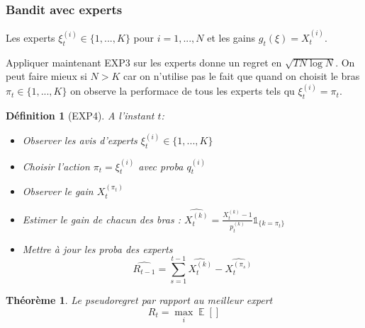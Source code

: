 \documentclass{article}
\DeclareMathOperator*{\E}{\mathbb{E}}
\newtheorem{definition}{Définition}[section]
\newtheorem{theorem}{Théorème}[section]
\theoremstyle{remark}
\theoremstyle{remark}
\begin{document}
\subsubsection{Bandit avec experts}

Les experts $\xi_t^{(i)} \in \{1, ..., K\}$ pour $i=1,...,N$ et les gains $g_t(\xi) = X_t^{(i)}$.

Appliquer maintenant EXP3 sur les experts donne un regret en $\sqrt{T N \log N}$. On peut faire mieux si $N>K$ car on n'utilise pas le fait que quand on choisit le bras $\pi_t \in \{1,...,K\}$ on observe la performace de tous les experts tels qu $\xi_t^{(i)} = \pi_t$.

\begin{definition}[EXP4]
   A l'instant $t$:
   \begin{itemize}
      \item Observer les avis d'experts $\xi_t^{(i)} \in \{1, ..., K\}$
      \item Choisir l'action $\pi_t = \xi_t^{(i)}$ avec proba $q_t^{(i)}$
      \item Observer le gain $X_t^{(\pi_t)}$
      \item Estimer le gain de chacun des bras : $\widehat{X_t^(k)} = \frac{X_t^{(k)}-1}{p_t^{(k)}} \mathbb{1}_{\{k = \pi_t\}}$
      \item Mettre à jour les proba des experts
      $$
         \widehat{R_{t-1}} = \sum_{s=1}^{t-1} \widehat{X_t^{(k)}} - \widehat{X_t^{(\pi_s)}}
      $$
   \end{itemize}
\end{definition}

\begin{theorem}
   Le pseudoregret par rapport au meilleur expert
   $$
   R_t = \max_i \E[]
   $$
\end{theorem}
\end{document}
